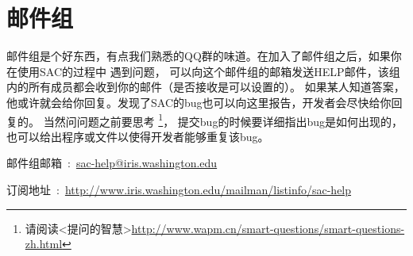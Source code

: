 \section{邮件组}
邮件组是个好东西，有点我们熟悉的QQ群的味道。在加入了邮件组之后，如果你在使用SAC的过程中
遇到问题，
可以向这个邮件组的邮箱发送HELP邮件，该组内的所有成员都会收到你的邮件（是否接收是可以设置的）。
如果某人知道答案，他或许就会给你回复。发现了SAC的bug也可以向这里报告，开发者会尽快给你回复的。
当然问问题之前要思考
\footnote{请阅读<提问的智慧>\url{http://www.wapm.cn/smart-questions/smart-questions-zh.html}}，
提交bug的时候要详细指出bug是如何出现的，也可以给出程序或文件以使得开发者能够重复该bug。

邮件组邮箱~:~\href{mailto:sac-help@iris.washington.edu}{sac-help@iris.washington.edu}

订阅地址~:~\small{\url{http://www.iris.washington.edu/mailman/listinfo/sac-help}}

